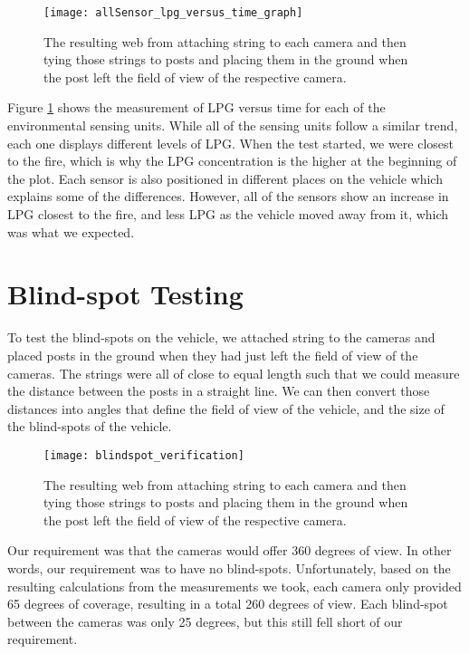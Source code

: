 \begin{figure}[H]
\centerline{\texttt{[image: allSensor\_lpg\_versus\_time\_graph]}}
\caption[]{The resulting web from attaching string to each camera and then tying those strings to posts and placing them in the ground when the post left the field of view of the respective camera.}
\label{fig:allSensor_lpg_versus_time_graph}
\end{figure}

Figure \ref{fig:allSensor_lpg_versus_time_graph} shows the measurement of LPG versus time for each of the environmental sensing units.  While all of the sensing units follow a similar trend, each one displays different levels of LPG.  When the test started, we were closest to the fire, which is why the LPG concentration is the higher at the beginning of the plot.  Each sensor is also positioned in different places on the vehicle which explains some of the differences.  However, all of the sensors show an increase in LPG closest to the fire, and less LPG as the vehicle moved away from it, which was what we expected.

\section{Blind-spot Testing}
To test the blind-spots on the vehicle, we attached string to the cameras and placed posts in the ground when they had just left the field of view of the cameras.  The strings were all of close to equal length such that we could measure the distance between the posts in a straight line.  We can then convert those distances into angles that define the field of view of the vehicle, and the size of the blind-spots of the vehicle.

\begin{figure}[H]
\centerline{\texttt{[image: blindspot\_verification]}}
\caption[]{The resulting web from attaching string to each camera and then tying those strings to posts and placing them in the ground when the post left the field of view of the respective camera.}
\label{fig:blindspot_verification}
\end{figure}

Our requirement was that the cameras would offer 360 degrees of view.  In other words, our requirement was to have no blind-spots.  Unfortunately, based on the resulting calculations from the measurements we took, each camera only provided 65 degrees of coverage, resulting in a total 260 degrees of view.  Each blind-spot between the cameras was only 25 degrees, but this still fell short of our requirement.

